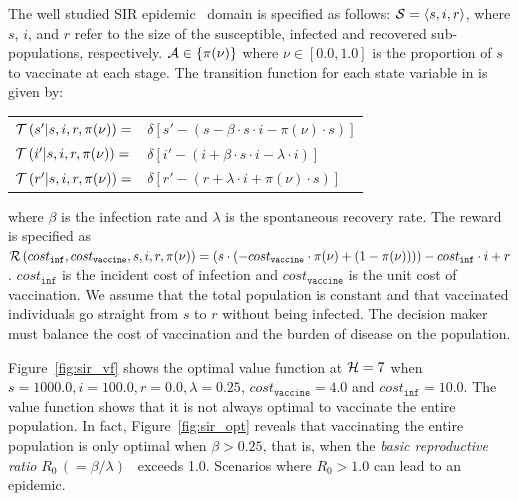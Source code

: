 The well studied SIR epidemic~\cite{KermackMcKendrick_1927} domain is specified as follows: {\footnotesize $ \mathcal{S} = \left\langle s, i, r \right\rangle$}, where $ s $, $ i $, and $ r $ refer to the size of the susceptible, infected and recovered sub-populations, respectively. {\footnotesize $ \mathcal{A} \in \left\lbrace \pi(\nu) \right\rbrace $} where {\footnotesize $\nu \in \left[0.0, 1.0\right]$} is the proportion of $ s $ to vaccinate at each stage. The transition function {\footnotesize \Transition} for each state variable in {\footnotesize \State} is given by:
    {\footnotesize 
        \abovedisplayskip=5pt
        \belowdisplayskip=0pt
        \renewcommand{\arraystretch}{1.5}
        \begin{tabular}{ll}
            $ \mathcal{T}\left( s' | s, i, r, \pi(\nu) \right) =$ & $ \delta \left[ s' - (s - \beta \cdot s \cdot i - \pi(\nu) \cdot s) \right] $ \\
            $ \mathcal{T}\left( i' | s, i, r, \pi(\nu) \right) =$ & $ \delta \left[ i' - (i + \beta \cdot s \cdot i - \lambda \cdot i) \right] $ \\
            $ \mathcal{T}\left( r' | s, i, r, \pi(\nu) \right) =$ & $ \delta \left[ r' - (r + \lambda \cdot i + \pi(\nu) \cdot s) \right] $ \\            
        \end{tabular}
    }%
where {\footnotesize $ \beta $} is the infection rate and {\footnotesize $\lambda$} is the spontaneous recovery rate. The reward is specified as {\footnotesize $ \mathcal{R}\left(cost_{\mathtt{inf}}, cost_{\mathtt{vaccine}}, s, i, r, \pi(\nu) \right) = (s \cdot (-cost_{\mathtt{vaccine}} \cdot \pi(\nu) + (1 - \pi(\nu)))) - cost_{\mathtt{inf}} \cdot i + r$}. {\footnotesize $ cost_{\mathtt{inf}} $} is the incident cost of infection and {\footnotesize $ cost_{\mathtt{vaccine}} $} is the unit cost of vaccination. We assume that the total population is constant and that vaccinated individuals go straight from {\footnotesize $ s $} to {\footnotesize $ r $} without being infected. The decision maker must balance the cost of vaccination and the burden of disease on the population. 

Figure~\ref{fig:sir_vf} shows the optimal value function at {\footnotesize$ \mathcal{H} = 7 $} when {\footnotesize $ s = 1000.0, i = 100.0, r = 0.0, \lambda = 0.25 $}, {\footnotesize $ cost_{\mathtt{vaccine}} = 4.0$} and {\footnotesize $ cost_{\mathtt{inf}} = 10.0 $}. The value function shows that it is not always optimal to vaccinate the entire population. In fact, Figure~\ref{fig:sir_opt} reveals that vaccinating the entire population is only optimal when {\footnotesize $ \beta > 0.25 $}, that is, when the \textit{basic reproductive ratio} {\footnotesize $ R_0 \,(= \beta/\lambda)$}~\cite{Heffernan_2005} exceeds 1.0. Scenarios where {\footnotesize $R_0 > 1.0$} can lead to an epidemic. 

